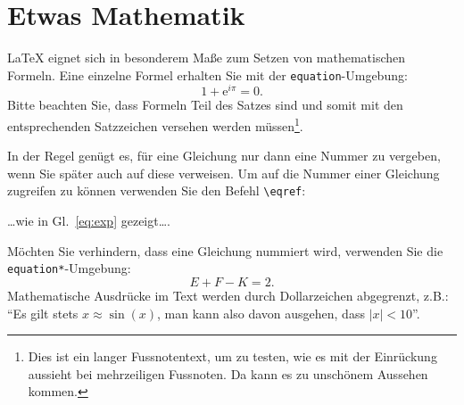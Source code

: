 \documentclass[arbeit=master,oneside,BCOR=12mm]{ArbeitRST}
\begin{document}
\section{Etwas Mathematik}
\LaTeX{} eignet sich in besonderem Maße zum Setzen von mathematischen Formeln. Eine einzelne Formel erhalten Sie mit der \texttt{equation}-Umgebung:
\begin{equation}\label{eq:exp}
1 + \mathrm{e}^{i\pi} = 0.
\end{equation}
Bitte beachten Sie, dass Formeln Teil des Satzes sind und somit mit den entsprechenden Satzzeichen versehen werden müssen\footnote{Dies ist ein langer Fussnotentext, um zu testen, wie es mit der Einrückung aussieht bei mehrzeiligen Fussnoten. Da kann es zu unschönem Aussehen kommen.}.

In der Regel genügt es, für eine Gleichung nur dann eine Nummer zu vergeben, wenn Sie später auch auf diese verweisen. Um auf die Nummer einer Gleichung zugreifen zu können verwenden Sie den Befehl \texttt{\textbackslash eqref}: 
\begin{center}
\ldots wie in Gl.\ \eqref{eq:exp} gezeigt\ldots	.
\end{center}
Möchten Sie verhindern, dass eine Gleichung nummiert wird, verwenden Sie die \texttt{equation*}-Umgebung:
\begin{equation*}
E + F - K = 2.
\end{equation*}
Mathematische Ausdrücke im Text werden durch Dollarzeichen abgegrenzt, z.B.: "`Es gilt stets $x \approx \sin(x)$, man kann also davon ausgehen, dass $|x| < 10$"'.
\end{document}
